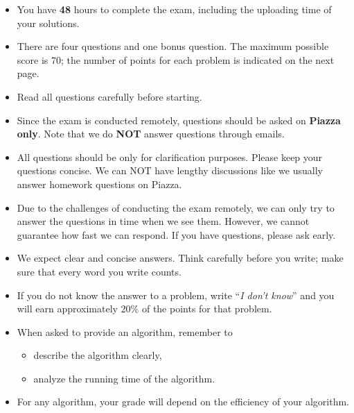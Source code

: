 \documentclass[12pt]{amsart}
\begin{document}
\begin{itemize}
\item
You have {\bf 48} hours to complete the exam, including the uploading time of your solutions. 
\item 
There are four questions and one bonus question. The maximum possible score is 70; the number of points for each problem is indicated on the next page.
\item
Read all questions carefully before starting.
\item
Since the exam is conducted remotely, questions should be asked on {\bf Piazza only}. Note that we do {\bf NOT} answer questions through emails. 
\item All questions should be only for clarification purposes. Please keep your questions concise. We can NOT have lengthy discussions like we usually answer homework questions on Piazza.
\item Due to the challenges of conducting the exam remotely, we can only try to answer the questions in time when we see them. However, we cannot guarantee how fast we can respond. If you have questions, please ask early.
\item
We expect clear and concise answers.  Think carefully before you write; make sure that every word you write counts. 
\item
If you do not know the answer to a problem, write ``\emph{I don't know}'' and you will earn approximately 20\% of the points for that problem.
\item
When asked to provide an algorithm, remember to
\begin{itemize}
\item
describe the algorithm clearly,
\item
analyze the running time of the algorithm.
\end{itemize}
\item For any algorithm, your grade will depend on the efficiency of your algorithm.
\end{itemize}
\end{document}
